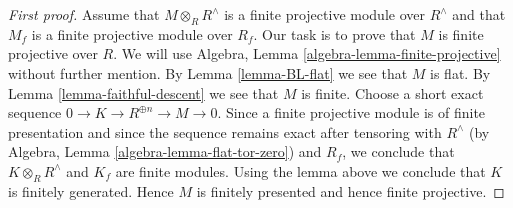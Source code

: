 \begin{proof}[First proof]
Assume that $M \otimes_R R^\wedge$ is a finite projective module over
$R^\wedge$ and that $M_f$ is a finite projective module over $R_f$.
Our task is to prove that $M$ is finite projective over $R$.
We will use Algebra, Lemma \ref{algebra-lemma-finite-projective}
without further mention.
By Lemma \ref{lemma-BL-flat} we see that $M$ is flat.
By Lemma \ref{lemma-faithful-descent} we see that $M$ is finite.
Choose a short exact sequence $0 \to K \to R^{\oplus n} \to M \to 0$.
Since a finite projective module is of finite presentation
and since the sequence remains exact after tensoring with
$R^\wedge$ (by Algebra, Lemma \ref{algebra-lemma-flat-tor-zero})
and $R_f$, we conclude that $K \otimes_R R^\wedge$ and $K_f$
are finite modules. Using the lemma above
we conclude that $K$ is finitely generated.
Hence $M$ is finitely presented and hence finite projective.
\end{proof}

